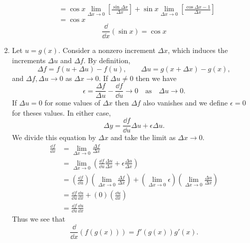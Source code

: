 \begin{Solution}
\begin{enumerate}
\begin{align*}
      &= \cos x \lim_{\Delta x \to 0} \left[ \frac{\sin \Delta x}{\Delta x}
      \right]
      + \sin x \lim_{\Delta x \to 0} \left[ \frac{\cos \Delta x - 1}
        {\Delta x} \right] \\
      &= \cos x
    \end{align*}
    \[
    \boxed{
      \frac{\dd}{\dd x} (\sin x) = \cos x
      }
    \]
  \item
    Let $u = g(x)$.
    Consider a nonzero increment $\Delta x$, which induces the increments
    $\Delta u$ and $\Delta f$.  By definition,
    \[
    \Delta f = f(u + \Delta u) - f(u), \qquad
    \Delta u = g(x + \Delta x) - g(x),
    \]
    and $\Delta f, \Delta u \to 0$ as $\Delta x \to 0$.
    If $\Delta u \neq 0$ then we have
    \[
    \epsilon = \frac{\Delta f}{\Delta u} - \frac{\dd f}{\dd u} \to 0 \quad \mathrm{as}
    \quad \Delta u \to 0.
    \]
    If $\Delta u = 0$ for some values of $\Delta x$ then $\Delta f$ also vanishes
    and we define $\epsilon = 0$ for theses values.  In either case,
    \[
    \Delta y = \frac{\dd f}{\dd u} \Delta u + \epsilon \Delta u.
    \]
    We divide this equation by $\Delta x$ and take the limit as $\Delta x \to 0$.
    \begin{align*}
      \frac{\dd f}{\dd x}
      &= \lim_{\Delta x \to 0} \frac{\Delta f}{\Delta x} \\
      &= \lim_{\Delta x \to 0} \left( \frac{\dd f}{\dd u}
        \frac{\Delta u}{\Delta x} + \epsilon \frac{\Delta u}{\Delta x}
      \right) \\
      &= \left( \frac{\dd f}{\dd u} \right) \left( \lim_{\Delta x \to 0}
        \frac{\Delta f}{\Delta x} \right) +
      \left( \lim_{\Delta x \to 0} \epsilon \right)
      \left( \lim_{\Delta x \to 0} \frac{\Delta u}{\Delta x} \right) \\
      &= \frac{\dd f}{\dd u} \frac{\dd u}{\dd x} +
      \left( 0 \right) \left( \frac{\dd u}{\dd x} \right) \\
      &= \frac{\dd f}{\dd u} \frac{\dd u}{\dd x}
    \end{align*}
    Thus we see that
    \[
    \boxed{
      \frac{\dd}{\dd x} (f(g(x))) = f'(g(x)) g'(x).
      }
    \]
  \end{enumerate}
  \renewcommand{\theenumi}{\arabic{enumi}}
\end{Solution}








